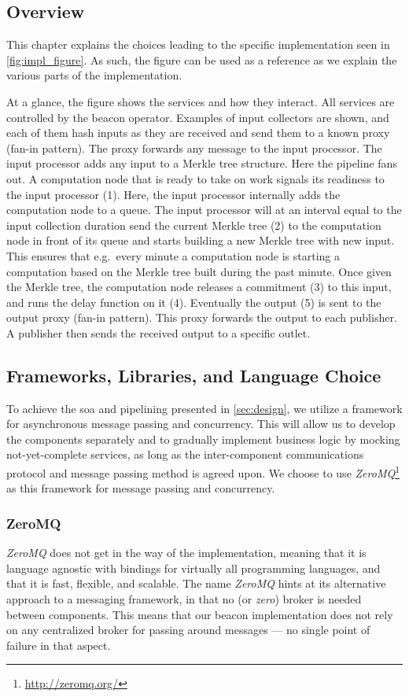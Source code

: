 \subsection{Overview}%
\label{sub:overview}
This chapter explains the choices leading to the specific implementation seen in \vref{fig:impl_figure}.
As such, the figure can be used as a reference as we explain the various parts of the implementation.

At a glance, the figure shows the services and how they interact.
All services are controlled by the beacon operator.
Examples of input collectors are shown, and each of them hash inputs as they are received and send them to a known proxy (fan-in pattern).
The proxy forwards any message to the input processor.
The input processor adds any input to a Merkle tree structure.
Here the pipeline fans out.
A computation node that is ready to take on work signals its readiness to the input processor (1).
Here, the input processor internally adds the computation node to a queue.
The input processor will at an interval equal to the input collection duration send the current Merkle tree (2) to the computation node in front of its queue and starts building a new Merkle tree with new input.
This ensures that e.g.\ every minute a computation node is starting a computation based on the Merkle tree built during the past minute.
Once given the Merkle tree, the computation node releases a commitment (3) to this input, and runs the delay function on it (4).
Eventually the output (5) is sent to the output proxy (fan-in pattern).
This proxy forwards the output to each publisher.
A publisher then sends the received output to a specific outlet.

\subsection{Frameworks, Libraries, and Language Choice}
To achieve the \acrfull{soa} and pipelining presented in \cref{sec:design}, we utilize a framework for asynchronous message passing and concurrency.
This will allow us to develop the components separately and to gradually implement business logic by mocking not-yet-complete services, as long as the inter-component communications protocol and message passing method is agreed upon.
We choose to use \textit{ZeroMQ}\footnote{\url{http://zeromq.org/}} as this framework for message passing and concurrency.

\subsubsection{ZeroMQ}
\textit{ZeroMQ} does not get in the way of the implementation, meaning that it is language agnostic with bindings for virtually all programming languages, and that it is fast, flexible, and scalable.
The name \textit{ZeroMQ} hints at its alternative approach to a messaging framework, in that no (or \textit{zero}) broker is needed between components.
This means that our beacon implementation does not rely on any centralized broker for passing around messages --- no single point of failure in that aspect.

